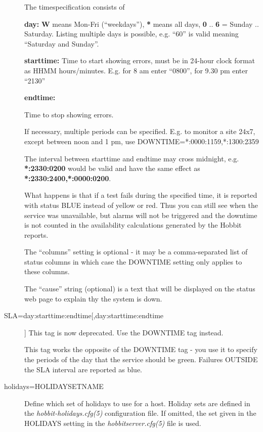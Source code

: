\begin{description}
  The timespecification consists of 


 \textbf{day:}
 \textbf{W}
 means Mon-Fri (``weekdays''), \textbf{*}
 means all days, \textbf{0}
 .. \textbf{6}
 = Sunday .. Saturday. Listing multiple days is possible, e.g. ``60'' is valid meaning ``Saturday and Sunday''. 


 \textbf{starttime:}
 Time to start showing errors, must be in 24-hour clock format as HHMM
 hours/minutes. E.g. for 8 am enter ``0800'', for 9.30 pm enter
 ``2130'' 



 \textbf{endtime:}

 Time to stop showing errors. 


 If necessary, multiple periods can be specified. E.g. to monitor a
 site 24x7, except between noon and 1 pm, use
 DOWNTIME=*:0000:1159,*:1300:2359 



 The interval between starttime and endtime may cross midnight, e.g. \textbf{*:2330:0200}
 would be valid and have the same effect as \textbf{*:2330:2400,*:0000:0200}. 


  What happens is that if a test fails during the specified time, it
  is reported with status BLUE instead of yellow or red. Thus you can
  still see when the service was unavailable, but alarms will not be
  triggered and the downtime is not counted in the availability
  calculations generated by the Hobbit reports. 



  The ``columns'' setting is optional - it may be a comma-separated
  list of status columns in which case the DOWNTIME setting only
  applies to these columns. 



  The ``cause'' string (optional) is a text that will be displayed on
  the status web page to explain thy the system is down. 



 

\item[SLA=day:starttime:endtime[,day:starttime:endtime]] This tag is now deprecated. Use the DOWNTIME tag instead. 

  This tag works the opposite of the DOWNTIME tag - you use it to
  specify the periods of the day that the service should be
  green. Failures OUTSIDE the SLA interval are reported as blue. 


\item[holidays=HOLIDAYSETNAME] Define which set of holidays to use for
  a host. Holiday sets are defined in the
  \emph{hobbit-holidays.cfg(5)} configuration file. If omitted, the
  set given in the HOLIDAYS setting in the \emph{hobbitserver.cfg(5)}
  file is used. 

\end{description}

